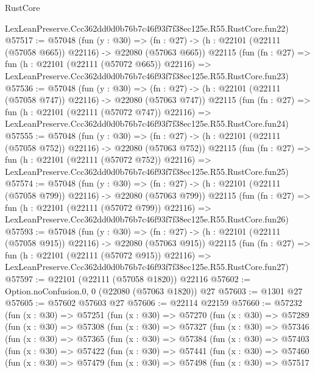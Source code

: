 \begin{lexlean}{RustCore}
\begin{coremodule}
    LexLeanPreserve.Ccc362dd0d0b76b7c46f93f7f38ec125e.R55.RustCore.fun22)
@57517 := @57048
    (fun (y : @30) =>
    (fn : @27) -> (h : @22101 (@22111 (@57058 @665)) @22116) -> @22080 (@57063 @665))
    @22115
    (fun (fn : @27) =>
    fun (h : @22101 (@22111 (@57072 @665)) @22116) =>
    LexLeanPreserve.Ccc362dd0d0b76b7c46f93f7f38ec125e.R55.RustCore.fun23)
@57536 := @57048
    (fun (y : @30) =>
    (fn : @27) -> (h : @22101 (@22111 (@57058 @747)) @22116) -> @22080 (@57063 @747))
    @22115
    (fun (fn : @27) =>
    fun (h : @22101 (@22111 (@57072 @747)) @22116) =>
    LexLeanPreserve.Ccc362dd0d0b76b7c46f93f7f38ec125e.R55.RustCore.fun24)
@57555 := @57048
    (fun (y : @30) =>
    (fn : @27) -> (h : @22101 (@22111 (@57058 @752)) @22116) -> @22080 (@57063 @752))
    @22115
    (fun (fn : @27) =>
    fun (h : @22101 (@22111 (@57072 @752)) @22116) =>
    LexLeanPreserve.Ccc362dd0d0b76b7c46f93f7f38ec125e.R55.RustCore.fun25)
@57574 := @57048
    (fun (y : @30) =>
    (fn : @27) -> (h : @22101 (@22111 (@57058 @799)) @22116) -> @22080 (@57063 @799))
    @22115
    (fun (fn : @27) =>
    fun (h : @22101 (@22111 (@57072 @799)) @22116) =>
    LexLeanPreserve.Ccc362dd0d0b76b7c46f93f7f38ec125e.R55.RustCore.fun26)
@57593 := @57048
    (fun (y : @30) =>
    (fn : @27) -> (h : @22101 (@22111 (@57058 @915)) @22116) -> @22080 (@57063 @915))
    @22115
    (fun (fn : @27) =>
    fun (h : @22101 (@22111 (@57072 @915)) @22116) =>
    LexLeanPreserve.Ccc362dd0d0b76b7c46f93f7f38ec125e.R55.RustCore.fun27)
@57597 := @22101 (@22111 (@57058 @1820)) @22116
@57602 := Option.noConfusion.{0, 0} (@22080 (@57063 @1820)) @27
@57603 := @1301 @27
@57605 := @57602 @57603 @27
@57606 := @22114 @22159
@57660 := @57232
    (fun (x : @30) =>
    @57251
      (fun (x : @30) =>
      @57270
        (fun (x : @30) =>
        @57289
          (fun (x : @30) =>
          @57308
            (fun (x : @30) =>
            @57327
              (fun (x : @30) =>
              @57346
                (fun (x : @30) =>
                @57365
                  (fun (x : @30) =>
                  @57384
                    (fun (x : @30) =>
                    @57403
                      (fun (x : @30) =>
                      @57422
                        (fun (x : @30) =>
                        @57441
                          (fun (x : @30) =>
                          @57460
                            (fun (x : @30) =>
                            @57479
                              (fun (x : @30) =>
                              @57498
                                (fun (x : @30) =>
                                @57517

\end{coremodule}
\end{lexlean}
